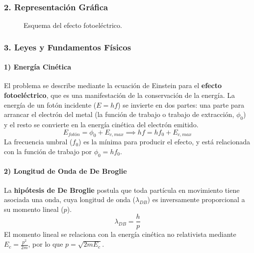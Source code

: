 \subsubsection*{2. Representación Gráfica}
\begin{figure}[H]
    \centering
    \caption{Esquema del efecto fotoeléctrico.}
\end{figure}

\subsubsection*{3. Leyes y Fundamentos Físicos}
\paragraph*{1) Energía Cinética}
El problema se describe mediante la ecuación de Einstein para el \textbf{efecto fotoeléctrico}, que es una manifestación de la conservación de la energía. La energía de un fotón incidente ($E=hf$) se invierte en dos partes: una parte para arrancar el electrón del metal (la función de trabajo o trabajo de extracción, $\phi_0$) y el resto se convierte en la energía cinética del electrón emitido.
$$E_{fotón} = \phi_0 + E_{c,max} \implies hf = hf_0 + E_{c,max}$$
La frecuencia umbral ($f_0$) es la mínima para producir el efecto, y está relacionada con la función de trabajo por $\phi_0 = hf_0$.

\paragraph*{2) Longitud de Onda de De Broglie}
La \textbf{hipótesis de De Broglie} postula que toda partícula en movimiento tiene asociada una onda, cuya longitud de onda ($\lambda_{DB}$) es inversamente proporcional a su momento lineal ($p$).
$$\lambda_{DB} = \frac{h}{p}$$
El momento lineal se relaciona con la energía cinética no relativista mediante $E_c = \frac{p^2}{2m}$, por lo que $p = \sqrt{2m E_c}$.


